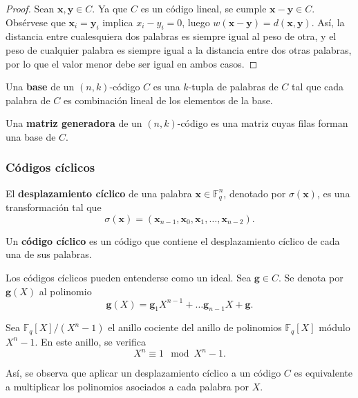 \begin{proof}
	Sean $\textbf{x}, \textbf{y} \in C$. Ya que $C$ es un código lineal, se cumple $\textbf{x} - \textbf{y} \in C$. Obsérvese que $\textbf{x}_i = \textbf{y}_i$ implica $x_i - y_i = 0$, luego $w(\textbf{x} - \textbf{y}) = d(\textbf{x}, \textbf{y})$. Así, la distancia entre cualesquiera dos palabras es siempre igual al peso de otra, y el peso de cualquier palabra es siempre igual a la distancia entre dos otras palabras, por lo que el valor menor debe ser igual en ambos casos.
\end{proof}

\begin{definition}
	Una \textbf{base} de un $(n, k)$-código $C$ es una $k$-tupla de palabras de $C$ tal que cada palabra de $C$ es combinación lineal de los elementos de la base.
\end{definition}

\begin{definition}
	Una \textbf{matriz generadora} de un $(n, k)$-código es una matriz cuyas filas forman una base de $C$.
\end{definition}

\subsubsection{Códigos cíclicos}

\begin{definition}
	El \textbf{desplazamiento cíclico} de una palabra $\textbf{x} \in \mathbb{F}_q^n$, denotado por $\sigma(\textbf{x})$, es una transformación tal que
	\[\sigma(\textbf{x}) = (\textbf{x}_{n-1}, \textbf{x}_0, \textbf{x}_1, \dots, \textbf{x}_{n-2}).\]
\end{definition}

\begin{definition}
	Un \textbf{código cíclico} es un código que contiene el desplazamiento cíclico de cada una de sus palabras.
\end{definition}

\begin{remark}
	Los códigos cíclicos pueden entenderse como un ideal. Sea $\textbf{g} \in C$. Se denota por $\textbf{g}(X)$ al polinomio
	\[\textbf{g}(X) = \textbf{g}_1X^{n-1} + \hdots \textbf{g}_{n-1}X + \textbf{g}.\]
	
	Sea $\mathbb{F}_q[X] / (X^n - 1)$ el anillo cociente del anillo de polinomios $\mathbb{F}_q[X]$ módulo $X^n - 1$. En este anillo, se verifica
	\[X^n \equiv 1 \mod X^n - 1.\]
	
	Así, se observa que aplicar un desplazamiento cíclico a un código $C$ es equivalente a multiplicar los polinomios asociados a cada palabra por $X$.
\end{remark}

